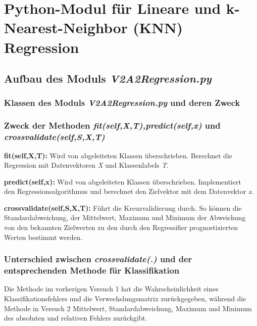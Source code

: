 \section{Python-Modul für Lineare und k-Nearest-Neighbor (KNN) Regression}


\subsection{
    Aufbau des Moduls \textit{V2A2\textunderscore Regression.py}
}

\subsubsection{ Klassen des Moduls \textit{V2A2\textunderscore Regression.py} und deren Zweck}

\subsubsection{ Zweck der Methoden \textit{fit(self,X,T),predict(self,x)} und \textit{crossvalidate(self,S,X,T)}}

\noindent
 \vspace{0px}
\textbf{fit(self,X,T):} Wird von abgeleiteten Klassen überschrieben. Berechnet die Regression mit Datenvektoren \textit{X} und Klassenlabels \textit{T}.

\noindent
 \vspace{0px}
\textbf{predict(self,x):} Wird von abgeleiteten Klassen überschrieben. Implementiert den Regressionsalgorithmus und berechnet den Zielvektor mit dem Datenvektor \textit{x}.

\noindent
 \vspace{0px}
\textbf{crossvalidate(self,S,X,T):} Führt die Kreuzvalidierung durch. So können die Standardabweichung, der Mittelwert, Maximum und Minimum der Abweichung von den bekannten Zielwerten zu den durch den Regressifier prognostizierten Werten bestimmt werden. 


\subsubsection{ Unterschied  zwischen \textit{crossvalidate(.)} und der entsprechenden Methode für Klassifikation}

\noindent
 \vspace{0px}
Die Methode im vorherigen Versuch 1 hat die Wahrscheinlichkeit eines Klassifikationsfehlers und die Verwechslungsmatrix zurückgegeben, während die Methode in Versuch 2 Mittelwert, Standardabweichung, Maximum und Minimum des absoluten und relativen Fehlers zurückgibt. 

